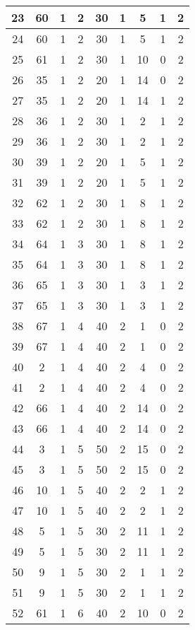 \begin{apendices}
{\begin{longtable}{|c|c|c|c|c|c|c|c|c|}
23 & 60 & 1 & 2 & 30 & 1 & 5 & 1 & 2 \\ \hline
24 & 60 & 1 & 2 & 30 & 1 & 5 & 1 & 2 \\ \hline
25 & 61 & 1 & 2 & 30 & 1 & 10 & 0 & 2 \\ \hline
26 & 35 & 1 & 2 & 20 & 1 & 14 & 0 & 2 \\ \hline
27 & 35 & 1 & 2 & 20 & 1 & 14 & 1 & 2 \\ \hline
28 & 36 & 1 & 2 & 30 & 1 & 2 & 1 & 2 \\ \hline
29 & 36 & 1 & 2 & 30 & 1 & 2 & 1 & 2 \\ \hline
30 & 39 & 1 & 2 & 20 & 1 & 5 & 1 & 2 \\ \hline
31 & 39 & 1 & 2 & 20 & 1 & 5 & 1 & 2 \\ \hline
32 & 62 & 1 & 2 & 30 & 1 & 8 & 1 & 2 \\ \hline
33 & 62 & 1 & 2 & 30 & 1 & 8 & 1 & 2 \\ \hline
34 & 64 & 1 & 3 & 30 & 1 & 8 & 1 & 2 \\ \hline
35 & 64 & 1 & 3 & 30 & 1 & 8 & 1 & 2 \\ \hline
36 & 65 & 1 & 3 & 30 & 1 & 3 & 1 & 2 \\ \hline
37 & 65 & 1 & 3 & 30 & 1 & 3 & 1 & 2 \\ \hline
38 & 67 & 1 & 4 & 40 & 2 & 1 & 0 & 2 \\ \hline
39 & 67 & 1 & 4 & 40 & 2 & 1 & 0 & 2 \\ \hline
40 & 2 & 1 & 4 & 40 & 2 & 4 & 0 & 2 \\ \hline
41 & 2 & 1 & 4 & 40 & 2 & 4 & 0 & 2 \\ \hline
42 & 66 & 1 & 4 & 40 & 2 & 14 & 0 & 2 \\ \hline
43 & 66 & 1 & 4 & 40 & 2 & 14 & 0 & 2 \\ \hline
44 & 3 & 1 & 5 & 50 & 2 & 15 & 0 & 2 \\ \hline
45 & 3 & 1 & 5 & 50 & 2 & 15 & 0 & 2 \\ \hline
46 & 10 & 1 & 5 & 40 & 2 & 2 & 1 & 2 \\ \hline
47 & 10 & 1 & 5 & 40 & 2 & 2 & 1 & 2 \\ \hline
48 & 5 & 1 & 5 & 30 & 2 & 11 & 1 & 2 \\ \hline
49 & 5 & 1 & 5 & 30 & 2 & 11 & 1 & 2 \\ \hline
50 & 9 & 1 & 5 & 30 & 2 & 1 & 1 & 2 \\ \hline
51 & 9 & 1 & 5 & 30 & 2 & 1 & 1 & 2 \\ \hline
52 & 61 & 1 & 6 & 40 & 2 & 10 & 0 & 2 \\ \hline

\end{longtable}}
\end{apendices}
